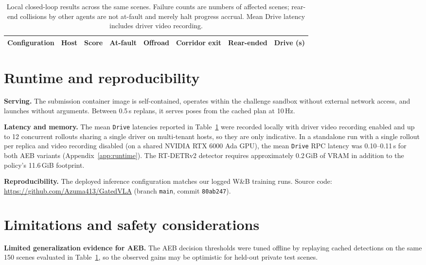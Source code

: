 \documentclass{article}
\begin{document}
\begin{table}[h]
\centering\footnotesize
\caption{Local closed-loop results across the same \RNScenes{} scenes. Failure counts are numbers of affected scenes; rear-end collisions by other agents are not at-fault and merely halt progress accrual. Mean Drive latency includes driver video recording.}
\label{tab:closedloop}
\begin{tabular}{llcccccc}
\toprule
Configuration & Host & Score & At-fault & Offroad & Corridor exit & Rear-ended & Drive (s) \\
\midrule

\bottomrule
\end{tabular}
\end{table}

\section{Runtime and reproducibility}
\textbf{Serving.} The submission container image is self-contained, operates within the challenge sandbox without external network access, and launches without arguments. Between 0.5\,s replans, it serves poses from the cached plan at 10\,Hz.

\textbf{Latency and memory.} The mean \texttt{Drive} latencies reported in Table~\ref{tab:closedloop} were recorded locally with driver video recording enabled and up to 12 concurrent rollouts sharing a single driver on multi-tenant hosts, so they are only indicative. In a standalone run with a single rollout per replica and video recording disabled (on a shared NVIDIA RTX 6000 Ada GPU), the mean \texttt{Drive} RPC latency was 0.10--0.11\,s for both AEB variants (Appendix~\ref{app:runtime}). The RT-DETRv2 detector requires approximately 0.2\,GiB of VRAM in addition to the policy's 11.6\,GiB footprint.

\textbf{Reproducibility.} The deployed inference configuration matches our logged W\&B training runs. Source code: \url{https://github.com/Azuma413/GatedVLA} (branch \texttt{main}, commit \texttt{80ab247}).

\section{Limitations and safety considerations}
\label{sec:limits}
\textbf{Limited generalization evidence for AEB.} The AEB decision thresholds were tuned offline by replaying cached detections on the same 150 scenes evaluated in Table~\ref{tab:closedloop}, so the observed gains may be optimistic for held-out private test scenes.
\end{document}
